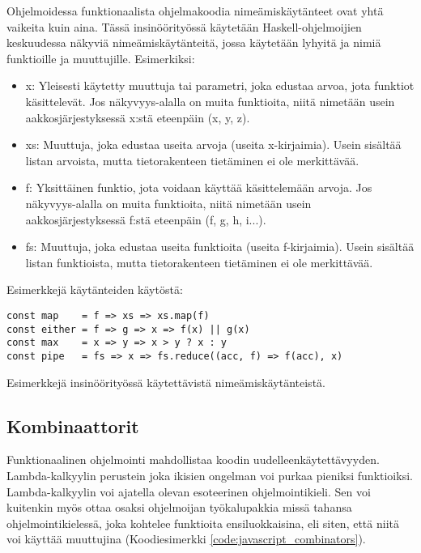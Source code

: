 Ohjelmoidessa funktionaalista ohjelmakoodia nimeämiskäytänteet ovat yhtä vaikeita kuin aina. Tässä insinöörityössä käytetään Haskell-ohjelmoijien keskuudessa näkyviä nimeämiskäytänteitä, jossa käytetään lyhyitä ja  nimiä funktioille ja muuttujille. Esimerkiksi:

\begin{itemize}
    \item x: Yleisesti käytetty muuttuja tai parametri, joka edustaa arvoa, jota funktiot käsittelevät. Jos näkyvyys-alalla on muita funktioita, niitä nimetään usein aakkosjärjestyksessä x:stä eteenpäin (x, y, z).
    \item xs: Muuttuja, joka edustaa useita arvoja (useita x-kirjaimia). Usein sisältää listan arvoista, mutta tietorakenteen tietäminen ei ole merkittävää.
    \item f: Yksittäinen funktio, jota voidaan käyttää käsittelemään arvoja. Jos näkyvyys-alalla on muita funktioita, niitä nimetään usein aakkosjärjestyksessä f:stä eteenpäin (f, g, h, i...).
    \item fs: Muuttuja, joka edustaa useita funktioita (useita f-kirjaimia). Usein sisältää listan funktioista, mutta tietorakenteen tietäminen ei ole merkittävää.
\end{itemize}

Esimerkkejä käytänteiden käytöstä:

\begin{code}
    \begin{verbatim}
const map    = f => xs => xs.map(f)
const either = f => g => x => f(x) || g(x)
const max    = x => y => x > y ? x : y
const pipe   = fs => x => fs.reduce((acc, f) => f(acc), x)
\end{verbatim}
    \caption{Esimerkkejä insinöörityössä käytettävistä nimeämiskäytänteistä.}
    \label{code:javascript_naming_convention_example}
\end{code}

\subsection{Kombinaattorit}

Funktionaalinen ohjelmointi mahdollistaa koodin uudelleenkäytettävyyden. Lambda-kalkyylin perustein joka ikisien ongelman voi purkaa pieniksi funktioiksi. \citep{BlellochHarper2015} Lambda-kalkyylin voi ajatella olevan esoteerinen ohjelmointikieli. Sen voi kuitenkin myös ottaa osaksi ohjelmoijan työkalupakkia missä tahansa ohjelmointikielessä, joka kohtelee funktioita ensiluokkaisina, eli siten, että niitä voi käyttää muuttujina (Koodiesimerkki \ref{code:javascript_combinators}).

